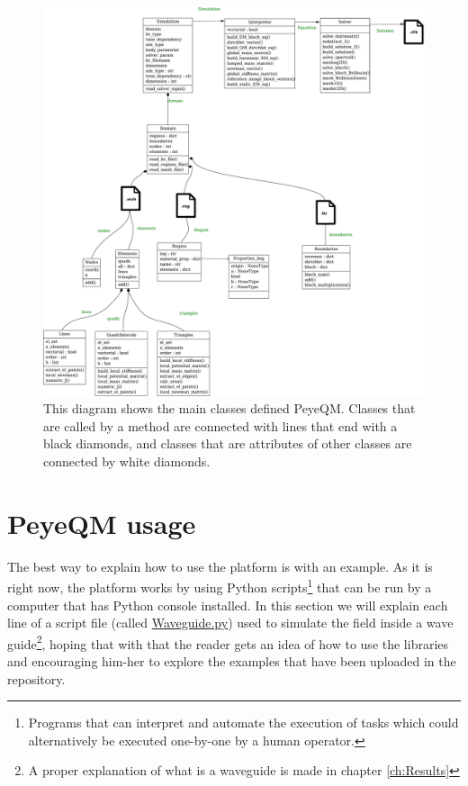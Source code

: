 \begin{figure}
\centering
\includegraphics[scale=0.35]{./img/class_diagram.pdf}
\caption{This diagram shows the main classes defined PeyeQM. Classes that are called by a method are connected with lines that end with a black diamonds, and classes that are attributes of other classes are connected by white diamonds.}
\label{fig:classes}
\end{figure}

\section{PeyeQM usage}
The best way to explain how to use the platform is with an example. As it is right now, the platform works by using Python scripts\footnote{Programs that can interpret and automate the execution of tasks which could alternatively be executed one-by-one by a human operator.} that can be run by a computer that has Python console installed. In this section we will explain each line of a script  file (called \href{https://github.com/bebopsan/peyeQM/blob/Depuration/Lib/OOPyQM/Examples/Square\%20waveguide/Waveguide.py}{Waveguide.py}) used to simulate the field inside a wave guide\footnote{A proper explanation of what is a waveguide is made in chapter \ref{ch:Results}}, hoping that with that the reader gets an idea of how to use the libraries and encouraging him-her to explore the examples that have been uploaded in the repository. 


